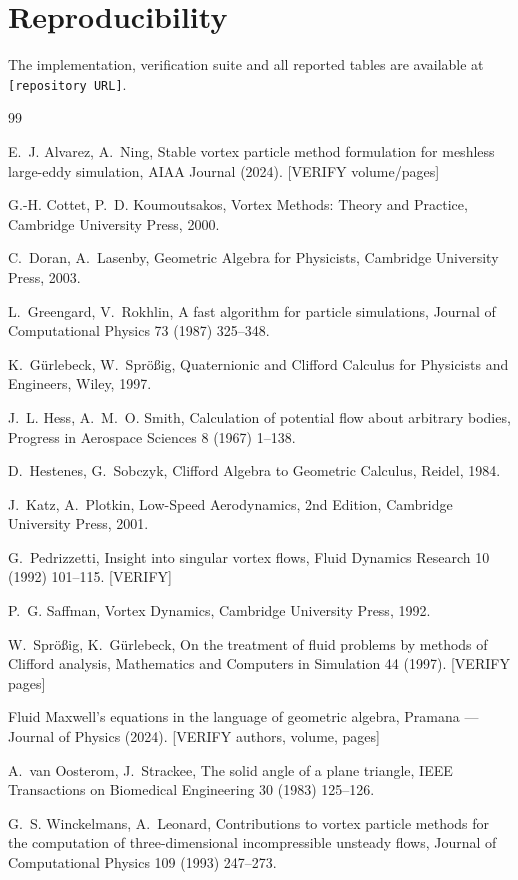 \documentclass[preprint,12pt,3p]{elsarticle}
\theoremstyle{remark}
\begin{document}
\section*{Reproducibility}

The implementation, verification suite and all reported tables are available at
\texttt{[repository URL]}.

\begin{thebibliography}{99}

E.~J. Alvarez, A.~Ning,
Stable vortex particle method formulation for meshless large-eddy simulation,
AIAA Journal (2024). [VERIFY volume/pages]

G.-H. Cottet, P.~D. Koumoutsakos,
Vortex Methods: Theory and Practice,
Cambridge University Press, 2000.

C.~Doran, A.~Lasenby,
Geometric Algebra for Physicists,
Cambridge University Press, 2003.

L.~Greengard, V.~Rokhlin,
A fast algorithm for particle simulations,
Journal of Computational Physics 73 (1987) 325--348.

K.~Gürlebeck, W.~Sprößig,
Quaternionic and Clifford Calculus for Physicists and Engineers,
Wiley, 1997.

J.~L. Hess, A.~M.~O. Smith,
Calculation of potential flow about arbitrary bodies,
Progress in Aerospace Sciences 8 (1967) 1--138.

D.~Hestenes, G.~Sobczyk,
Clifford Algebra to Geometric Calculus,
Reidel, 1984.

J.~Katz, A.~Plotkin,
Low-Speed Aerodynamics, 2nd Edition,
Cambridge University Press, 2001.

G.~Pedrizzetti,
Insight into singular vortex flows,
Fluid Dynamics Research 10 (1992) 101--115. [VERIFY]

P.~G. Saffman,
Vortex Dynamics,
Cambridge University Press, 1992.

W.~Sprößig, K.~Gürlebeck,
On the treatment of fluid problems by methods of Clifford analysis,
Mathematics and Computers in Simulation 44 (1997). [VERIFY pages]

Fluid Maxwell's equations in the language of geometric algebra,
Pramana --- Journal of Physics (2024). [VERIFY authors, volume, pages]

A.~van Oosterom, J.~Strackee,
The solid angle of a plane triangle,
IEEE Transactions on Biomedical Engineering 30 (1983) 125--126.

G.~S. Winckelmans, A.~Leonard,
Contributions to vortex particle methods for the computation of
three-dimensional incompressible unsteady flows,
Journal of Computational Physics 109 (1993) 247--273.

\end{thebibliography}
\end{document}
